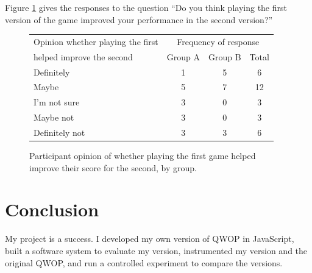 \documentclass[12pt,a4paper,twoside,openright]{report}
\begin{document}
Figure \ref{firstHelpedSecond} gives the responses to the question ``Do you think playing the first version of the game improved your performance in the second version?''
\begin{figure}[tbh]
    \begin{center}
    \begin{tabular}{ |p{6cm}|c|c|c| }
      \hline
    Opinion whether playing the first& \multicolumn{3}{|c|}{Frequency of response} \\ \cline{2-4}
    helped improve the second& Group A& Group B&Total\\ \hline
    Definitely     & 1 & 5 & 6 \\ \hline
    Maybe          & 5 & 7 & 12\\ \hline
    I'm not sure   & 3 & 0 & 3 \\ \hline
    Maybe not      & 3 & 0 & 3 \\ \hline
    Definitely not & 3 & 3 & 6 \\ \hline
    \end{tabular}
    \end{center}
    \caption{Participant opinion of whether playing the first game helped improve their score for the second, by group.}
    \label{firstHelpedSecond}
\end{figure}










\chapter{Conclusion}

My project is a success. I developed my own version of QWOP in JavaScript,
built a software system to evaluate my version, instrumented my version and the original QWOP, and run a controlled experiment to compare the versions.
\end{document}
